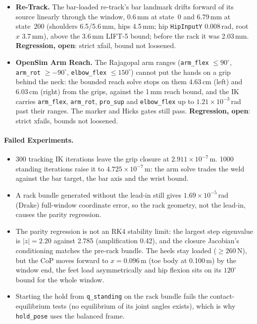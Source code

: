 \documentclass[11pt,a4paper]{article}
\begin{document}
\begin{itemize}[nosep]
  rack it was $2\times10^{-10}$\,rad. \textbf{Regression, open}: the test is
  a strict xfail, the bound is not loosened.
\item \textbf{Re-Track.} The bar-loaded re-track's bar landmark drifts
  forward of its source linearly through the window, 0.6\,mm at state~0 and
  6.79\,mm at state~200 (shoulders 6.5/5.6\,mm, hips 4.5\,mm; hip
  \texttt{HipInputY} 0.008\,rad, root $x$ 3.7\,mm), above the 3.6\,mm LIFT-5
  bound; before the rack it was 2.03\,mm. \textbf{Regression, open}: strict
  xfail, bound not loosened.
\item \textbf{OpenSim Arm Reach.} The Rajagopal arm ranges
  (\texttt{arm\_flex} $\le 90^\circ$, \texttt{arm\_rot} $\ge -90^\circ$,
  \texttt{elbow\_flex} $\le 150^\circ$) cannot put the hands on a grip behind
  the neck: the bounded reach solve stops on them 4.63\,cm (left) and
  6.03\,cm (right) from the grips, against the 1\,mm reach bound, and the IK
  carries \texttt{arm\_flex}, \texttt{arm\_rot}, \texttt{pro\_sup} and
  \texttt{elbow\_flex} up to $1.21\times10^{-3}$\,rad past their ranges.
  The marker and Hicks gates still pass. \textbf{Regression, open}: strict
  xfails, bounds not loosened.
\end{itemize}

\paragraph{Failed Experiments.}
\begin{itemize}[nosep]
\item 300 tracking IK iterations leave the grip closure at
  $2.911\times10^{-7}$\,m. 1000 standing iterations raise it to
  $4.725\times10^{-7}$\,m: the arm solve trades the weld against the bar
  target, the bar axis and the wrist bound.
\item A rack bundle generated without the lead-in still gives
  $1.69\times10^{-5}$\,rad (Drake) full-window coordinate error, so the rack
  geometry, not the lead-in, causes the parity regression.
\item The parity regression is not an RK4 stability limit: the largest
  step eigenvalue is $|z| = 2.20$ against 2.785 (amplification 0.42), and
  the closure Jacobian's conditioning matches the pre-rack bundle. The heels
  stay loaded ($\ge 260$\,N), but the CoP moves forward to $x = 0.096$\,m
  (toe body at 0.100\,m) by the window end, the feet load asymmetrically and
  hip flexion sits on its $120^\circ$ bound for the whole window.
\item Starting the hold from \texttt{q\_standing} on the rack bundle fails
  the contact-equilibrium tests (no equilibrium of its joint angles exists),
  which is why \texttt{hold\_pose} uses the balanced frame.
\end{itemize}
\end{document}
